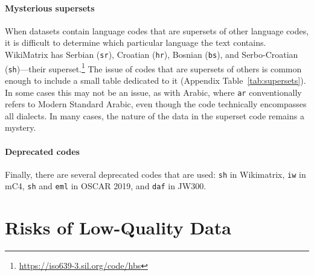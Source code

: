 \paragraph{Mysterious supersets}
When datasets contain language codes that are supersets of other language codes, it is difficult to determine which particular language the text contains. WikiMatrix has Serbian (\texttt{sr}), Croatian (\texttt{hr}), Bosnian (\texttt{bs}), and Serbo-Croatian (\texttt{sh})---their superset.\footnote{\url{https://iso639-3.sil.org/code/hbs}}
The issue of codes that are supersets of others is common enough to include a small table dedicated to it (Appendix Table~\ref{tab:supersets}).
In some cases this may not be an issue, as with Arabic, where \texttt{ar} conventionally refers to Modern Standard Arabic, even though the code technically encompasses all dialects.
In many cases, the nature of the data in the superset code remains a mystery.


\paragraph{Deprecated codes} Finally, there are several deprecated codes that are used: \texttt{sh} in Wikimatrix, \texttt{iw} in mC4, \texttt{sh} and \texttt{eml} in OSCAR 2019, and \texttt{daf} in JW300.

\section{Risks of Low-Quality Data}\label{sec:risk}

